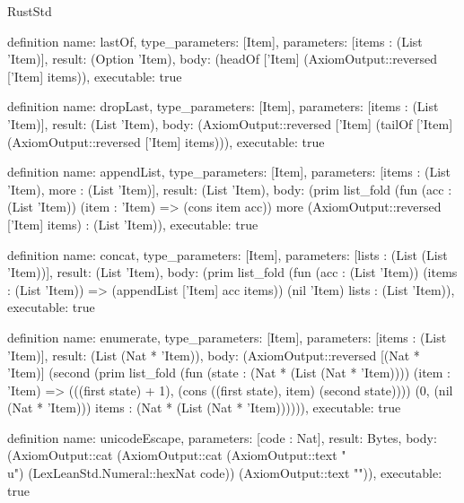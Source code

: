 \begin{lexlean}{RustStd}
\begin{semanticmodule}
definition{
  name: lastOf,
  type_parameters: [Item],
  parameters: [items : (List 'Item)],
  result: (Option 'Item),
  body: (headOf ['Item] (AxiomOutput::reversed ['Item] items)),
  executable: true
}

definition{
  name: dropLast,
  type_parameters: [Item],
  parameters: [items : (List 'Item)],
  result: (List 'Item),
  body: (AxiomOutput::reversed ['Item] (tailOf ['Item] (AxiomOutput::reversed ['Item] items))),
  executable: true
}

definition{
  name: appendList,
  type_parameters: [Item],
  parameters: [items : (List 'Item), more : (List 'Item)],
  result: (List 'Item),
  body: (prim list_fold (fun (acc : (List 'Item)) (item : 'Item) => (cons item acc)) more (AxiomOutput::reversed ['Item] items) : (List 'Item)),
  executable: true
}

definition{
  name: concat,
  type_parameters: [Item],
  parameters: [lists : (List (List 'Item))],
  result: (List 'Item),
  body: (prim list_fold (fun (acc : (List 'Item)) (items : (List 'Item)) => (appendList ['Item] acc items)) (nil 'Item) lists : (List 'Item)),
  executable: true
}

definition{
  name: enumerate,
  type_parameters: [Item],
  parameters: [items : (List 'Item)],
  result: (List (Nat * 'Item)),
  body: (AxiomOutput::reversed [(Nat * 'Item)] (second (prim list_fold (fun (state : (Nat * (List (Nat * 'Item)))) (item : 'Item) => (((first state) + 1), (cons ((first state), item) (second state)))) (0, (nil (Nat * 'Item))) items : (Nat * (List (Nat * 'Item)))))),
  executable: true
}

definition{
  name: unicodeEscape,
  parameters: [code : Nat],
  result: Bytes,
  body: (AxiomOutput::cat (AxiomOutput::cat (AxiomOutput::text "\\u{") (LexLeanStd.Numeral::hexNat code)) (AxiomOutput::text "}")),
  executable: true
}


\end{semanticmodule}
\end{lexlean}
